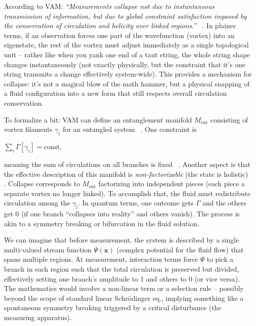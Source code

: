 \documentclass[a4paper, aps,preprint,superscriptaddress, 12pt]{revtex4}
\begin{document}
According to VAM: \textit{“Measurements collapse not due to instantaneous transmission of information, but due to global constraint satisfaction imposed by the conservation of circulation and helicity over linked regions.”}~\cite{Iskandarani2025c} . In plainer terms, if an observation forces one part of the wavefunction (vortex) into an eigenstate, the rest of the vortex must adjust immediately as a single topological unit – rather like when you yank one end of a taut string, the whole string shape changes instantaneously (not exactly physically, but the constraint that it’s one string transmits a change effectively system-wide). This provides a mechanism for collapse: it’s not a magical blow of the math hammer, but a physical snapping of a fluid configuration into a new form that still respects overall circulation conservation.


To formalize a bit: VAM can define an entanglement manifold $M_{\text{ent}}$ consisting of vortex filaments ${\gamma_i}$ for an entangled system~\cite{Iskandarani2025c} . One constraint is

$\sum_i \Gamma[\gamma_i] = \text{const},$

meaning the sum of circulations on all branches is fixed~\cite{Iskandarani2025c} . Another aspect is that the effective description of this manifold is \textit{non-factorizable} (the state is holistic)~\cite{Iskandarani2025c} . Collapse corresponds to $M_{\text{ent}}$ factorizing into independent pieces (each piece a separate vortex no longer linked). To accomplish that, the fluid must redistribute circulation among the $\gamma_i$. In quantum terms, one outcome gets $\Gamma$ and the others get 0 (if one branch “collapses into reality” and others vanish). The process is akin to a symmetry breaking or bifurcation in the fluid solution.


We can imagine that before measurement, the system is described by a single multi-valued stream function $\Psi(\mathbf{x})$ (complex potential for the fluid flow) that spans multiple regions. At measurement, interaction terms force $\Psi$ to pick a branch in each region such that the total circulation is preserved but divided, effectively setting one branch’s amplitude to 1 and others to 0 (or vice versa). The mathematics would involve a non-linear term or a selection rule – possibly beyond the scope of standard linear Schrödinger eq., implying something like a spontaneous symmetry breaking triggered by a critical disturbance (the measuring apparatus).
\end{document}
